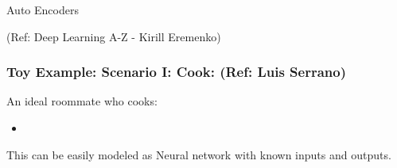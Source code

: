 \begin{frame}
  \begin{center}
    {\Large Auto Encoders}
  \end{center}
  
\tiny{(Ref: Deep Learning A-Z -  Kirill Eremenko)}    
\end{frame}

\begin{frame}[fragile] \frametitle{Toy Example: Scenario I: Cook: (Ref: Luis Serrano)}
An ideal roommate who cooks:
\begin{itemize}
\item 
\end{itemize}
This can be easily modeled as Neural network with known inputs and outputs.
\end{frame}
